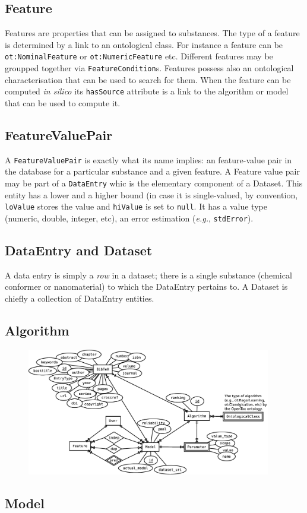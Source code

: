 \subsection{Feature}
Features are properties that can be assigned to substances. The type of
a feature is determined by a link to an ontological class. For instance
a feature can be \texttt{ot:NominalFeature} or \texttt{ot:NumericFeature}
etc. Different features may be groupped together via \texttt{FeatureCondition}s.
Features possess also an ontological characterisation that can be 
used to search for them. When the feature can be computed \textit{in silico}
its \texttt{hasSource} attribute
is a link to the algorithm or model that can be used to compute it.


\subsection{FeatureValuePair}
A \texttt{FeatureValuePair} is exactly what its name implies: 
an feature-value pair in the database
for a particular substance and a given feature.
A Feature value pair may be part of a \texttt{DataEntry} whic is 
the elementary component of a Dataset. This entity has a lower
and a higher bound (in case it is single-valued, by convention,
\texttt{loValue} stores the value and \texttt{hiValue} is set to 
\texttt{null}. It has a value type (numeric, double, integer, 
etc), an error estimation (\textit{e.g.}, \texttt{stdError}).


\subsection{DataEntry and Dataset}
A data entry is simply a \textit{row} in a dataset;
there is a single substance (chemical conformer or nanomaterial) to which
the DataEntry pertains to. A Dataset is chiefly a collection of 
DataEntry entities. 



\subsection{Algorithm}
\lipsum[1]

\begin{figure}[h]
 \centering
 \includegraphics[keepaspectratio=true,width=0.95\textwidth]{figures/model_algorithm}
\end{figure}

\subsection{Model}
\lipsum[2]